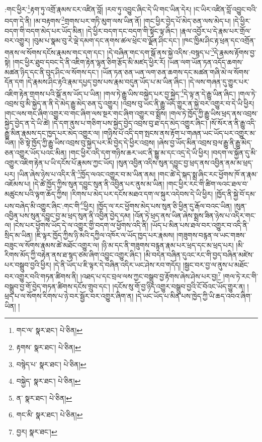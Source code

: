 :གང་ཕྱིར་\footnote{གང་ལ་  སྣར་ཐང་།  པེ་ཅིན། }རྟག་ཏུ་འགྲོ་རྣམས་ངར་འཛིན་བློ། །རབ་ཏུ་འབྱུང་ཞིང་དེ་ཡི་གང་ཡིན་དེར། །ང་ཡིར་འཛིན་བློ་འབྱུང་བའི་བདག་དེ་ནི། །མ་བརྟགས་\footnote{རྟགས་  སྣར་ཐང་།  པེ་ཅིན། }གྲགས་པར་གཏི་མུག་ལས་ཡིན་ནོ། །གང་ཕྱིར་བྱེད་པོ་མེད་ཅན་ལས་མེད་པ། །དེ་ཕྱིར་བདག་གི་བདག་མེད་པར་ཡོད་མིན། །དེ་ཕྱིར་བདག་དང་བདག་གི་སྟོང་ལྟ་ཞིང་། །རྣལ་འབྱོར་པ་དེ་རྣམ་པར་གྲོལ་བར་འགྱུར། །བུམ་པ་སྣམ་བུ་རེ་ལྡེ་དམག་དང་ནགས་ཚལ་ཕྲེང་བ་ལྗོན་ཤིང་དང་། །ཁང་ཁྱིམ་ཤིང་རྟ་ཕྲན་དང་འགྲོན་གནས་ལ་སོགས་དངོས་རྣམས་གང་དག་དང་། །དེ་བཞིན་གང་དག་སྒོ་ནས་སྐྱེ་འདིས་:བསྙད་པ་\footnote{བསྙེད་པ་  སྣར་ཐང་།  པེ་ཅིན། }དེ་རྣམས་རྟོགས་བྱ་སྟེ། །གང་ཕྱིར་ཐུབ་དབང་དེ་ནི་འཇིག་རྟེན་ལྷན་ཅིག་རྩོད་མི་མཛད་ཕྱིར་རོ། །ཡན་ལག་ཡོན་ཏན་འདོད་ཆགས་མཚན་ཉིད་དང་ནི་བུད་ཤིང་ལ་སོགས་དང་། །ཡོན་ཏན་ཅན་ཡན་ལག་ཅན་ཆགས་དང་མཚན་གཞི་མེ་ལ་སོགས་དོན་དག །དེ་རྣམས་ཤིང་རྟའི་རྣམ་དཔྱད་བྱས་པས་རྣམ་བདུན་ཡོད་པ་མ་ཡིན་ཞིང་། །དེ་ལས་གཞན་དུ་གྱུར་པར་འཇིག་རྟེན་གྲགས་པའི་སྒོ་ནས་ཡོད་པ་ཡིན། །གལ་ཏེ་རྒྱུ་ཡིས་བསྐྱེད་པར་བྱ་སྐྱེད་\footnote{བསྐྱེད་  སྣར་ཐང་།  པེ་ཅིན། }དེ་ལྟ་ན་དེ་རྒྱུ་ཡིན་ཞིང་། །གལ་ཏེ་འབྲས་བུ་མི་སྐྱེད་ན་ནི་དེ་མེད་རྒྱུ་མེད་ཅན་དུ་འགྱུར། །འབྲས་བུ་ཡང་ནི་རྒྱུ་ཡོད་གྱུར་ན་སྐྱེ་བར་འགྱུར་བ་དེ་ཡི་ཕྱིར། །གང་ལས་གང་ཞིག་འགྱུར་བ་གང་ཞིག་ལས་སྔར་གང་ཞིག་འགྱུར་བ་སྨྲོས། །གལ་ཏེ་ཁྱོད་ཀྱི་རྒྱུ་ཡིས་ཕྲད་ནས་འབྲས་སྐྱེད་བྱེད་ན་དེ་ཡི་ཚེ། །དེ་དག་ནུས་པ་གཅིག་པས་སྐྱེད་བྱེད་འབྲས་བུ་ཐ་དད་མེད་འགྱུར་ཞིང་། །སོ་སོར་ན་ནི་རྒྱུ་འདི་རྒྱུ་མིན་རྣམས་དང་ཁྱད་པར་མེད་འགྱུར་ལ། །གཉིས་པོ་འདི་དག་སྤངས་ནས་རྟོག་པ་གཞན་ཡང་ཡོད་པར་འགྱུར་མ་ཡིན། །ཅི་སྟེ་ཁྱོད་ཀྱི་རྒྱུ་ཡིས་འབྲས་བུ་སྐྱེད་པར་མི་བྱེད་དེ་ཕྱིར་འབྲས། །ཞེས་བྱ་ཡོད་མིན་འབྲས་བྲལ་རྒྱུ་ནི་རྒྱུ་མེད་ཅན་འགྱུར་ཡོད་པའང་མིན། །གང་ཕྱིར་འདི་དག་གཉིས་ཆར་ཡང་ནི་སྒྱུ་མ་དང་འདྲ་དེ་ཡི་ཕྱིར། །བདག་ལ་སྐྱོན་དུ་མི་འགྱུར་འཇིག་རྟེན་པ་ཡི་དངོས་པོ་རྣམས་ཀྱང་ཡོད། །སུན་འབྱིན་འདིས་སུན་དབྱུང་བྱ་ཕྲད་ནས་འབྱིན་ནམ་མ་ཕྲད་པར། །ཡིན་ཞེས་ཉེས་པ་འདིར་ནི་\footnote{ན་  སྣར་ཐང་།  པེ་ཅིན། }ཁྱོད་ལའང་འགྱུར་བ་མ་ཡིན་ནམ། །གང་ཚེ་དེ་སྐད་སྨྲ་ཞིང་རང་ཕྱོགས་ཁོ་ན་རྣམ་འཇོམས་པ། །དེ་ཚེ་ཁྱོད་ཀྱིས་སུན་དབྱུང་སུན་ནི་འབྱིན་པར་ནུས་མ་ཡིན། །གང་ཕྱིར་རང་གི་ཚིག་ལའང་ཐལ་བ་མཚུངས་པའི་ལྟག་ཆོད་ཀྱིས། །རིགས་པ་མེད་པར་དངོས་མཐའ་དག་ལ་སྐུར་འདེབས་དེ་ཡི་ཕྱིར། །ཁྱོད་ནི་སྐྱེ་བོ་དམ་པས་བཞེད་མི་འགྱུར་ཞིང་:གང་གི་\footnote{གང་མི་  སྣར་ཐང་།  པེ་ཅིན། }ཕྱིར། །ཁྱོད་ལ་རང་ཕྱོགས་མེད་པས་སུན་ཅི་ཕྱིན་དུ་རྒོལ་བའང་ཡིན། །སུན་འབྱིན་པས་སུན་དབྱུང་བྱ་མ་ཕྲད་སུན་ནི་འབྱིན་བྱེད་དམ། །འོན་ཏེ་ཕྲད་ནས་ཡིན་ཞེས་སྨྲས་ཟིན་ཉེས་པ་འདིར་གང་ལ། །ངེས་པར་ཕྱོགས་ཡོད་དེ་ལ་འགྱུར་གྱི་བདག་ལ་ཕྱོགས་འདི་ནི། །ཡོད་པ་མིན་པས་ཐལ་བར་འགྱུར་བ་འདི་ནི་སྲིད་མ་ཡིན། །ཇི་ལྟར་ཁྱོད་ཀྱིས་ཉི་མའི་དཀྱིལ་འཁོར་ལ་ཡོད་ཁྱད་པར་རྣམས། །གཟུགས་བརྙན་ལ་ཡང་གཟས་བཟུང་ལ་སོགས་རྣམས་ཚེ་མཐོང་འགྱུར་ལ། །ཉི་མ་དང་ནི་གཟུགས་བརྙན་རྣམ་པར་ཕྲད་དང་མ་ཕྲད་པར། །མི་རིགས་མོད་ཀྱི་བརྟེན་ནས་ཐ་སྙད་ཙམ་ཞིག་འབྱུང་འགྱུར་ཞིང་། །མི་བདེན་བཞིན་དུའང་རང་གི་བྱད་བཞིན་མཛེས་པར་བསྒྲུབ་བྱའི་ཕྱིར། །དེ་ནི་ཡོད་པ་ཇི་ལྟར་དེ་བཞིན་འདིར་ཡང་ཤེས་རབ་གདོད། །སྦྱང་བར་བྱ་ལ་ནུས་པ་མཐོང་བར་འགྱུར་བའི་གཏན་ཚིགས་ནི། །འཐད་པ་དང་བྲལ་ལས་ཀྱང་བསྒྲུབ་བྱ་རྟོགས་ཞེས་ཤེས་པར་བྱ།\footnote{བྱར།  སྣར་ཐང་། } །གལ་ཏེ་རང་གི་བསྒྲུབ་བྱ་གོ་བྱེད་གཏན་ཚིགས་དངོས་གྲུབ་དང་། །དངོས་སུ་གོ་བྱ་ཉིད་འགྱུར་བསྒྲུབ་བྱའི་ངོ་བོའང་ཡོད་གྱུར་ན། །ཕྲད་པ་ལ་སོགས་རིགས་པ་ཉེ་བར་སྦྱོར་བར་འགྱུར་ཞིག་ན། །དེ་ཡང་ཡོད་པ་མིན་པས་ཁྱེད་ཀྱི་ཡི་ཆད་འབའ་ཞིག་ཡིན། །
